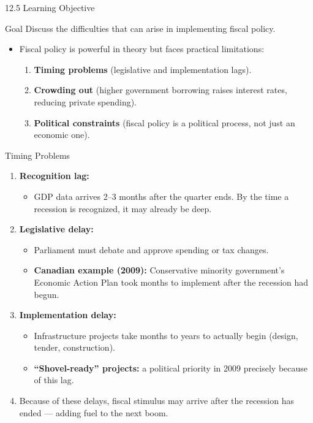 \documentclass[aspectratio=169]{beamer}
\begin{document}
\begin{frame}{12.5 Learning Objective}
\transfade
\begin{block}{Goal}
Discuss the difficulties that can arise in implementing fiscal policy.
\end{block}
\begin{itemize}[<+->]
  \item Fiscal policy is powerful in theory but faces practical limitations:
  \begin{enumerate}[<+->]
    \item \textbf{Timing problems} (legislative and implementation lags).
    \item \textbf{Crowding out} (higher government borrowing raises interest rates, reducing private spending).
    \item \textbf{Political constraints} (fiscal policy is a political process, not just an economic one).
  \end{enumerate}
\end{itemize}
\end{frame}

\begin{frame}{Timing Problems}
\transfade
\begin{enumerate}[<+->]
  \item \textbf{Recognition lag:}
  \begin{itemize}[<+->]
    \item GDP data arrives 2--3 months after the quarter ends. By the time a recession is recognized, it may already be deep.
  \end{itemize}
  \item \textbf{Legislative delay:}
  \begin{itemize}[<+->]
    \item Parliament must debate and approve spending or tax changes.
    \item \textbf{Canadian example (2009):} Conservative minority government's Economic Action Plan took months to implement after the recession had begun.
  \end{itemize}
  \item \textbf{Implementation delay:}
  \begin{itemize}[<+->]
    \item Infrastructure projects take months to years to actually begin (design, tender, construction).
    \item \textbf{``Shovel-ready'' projects:} a political priority in 2009 precisely because of this lag.
  \end{itemize}
  \item Because of these delays, fiscal stimulus may arrive \alert{after the recession has ended} --- adding fuel to the next boom.
\end{enumerate}
\end{frame}
\end{document}
